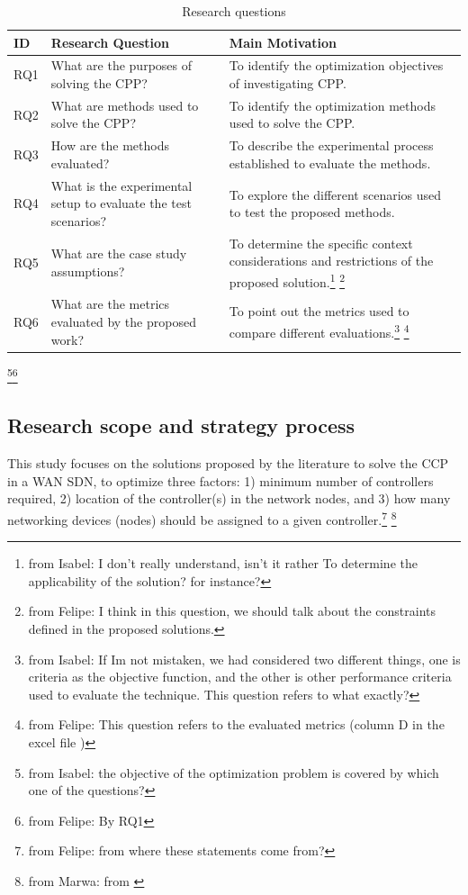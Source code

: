 \documentclass{IEEEtran}
\newcommand\fia[1]{{\color{red}\footnote{\color{red}from Isabel: #1}}} %
\newcommand\dia[1]{{\color{blue}\footnote{\color{blue}from Felipe: #1}}}
\newcommand\mc[1]{{\color{green}\footnote{\color{green}from Marwa: #1}}}
\begin{document}
\begin{table}[!h]
    \centering
    \begin{tabular}{l p{3.2cm} p{3.6cm} }
  \hline
  ID & Research Question & Main Motivation \\
  \hline
  RQ1 & What are the purposes of solving the CPP? & To identify the optimization objectives of investigating CPP. \\
  RQ2 & What are methods used to solve the CPP? & To identify the optimization methods used to solve the CPP. \\
  RQ3 & How are the methods evaluated? & To describe the experimental process established to evaluate the methods. \\%
  RQ4 & What is the experimental setup to evaluate the test scenarios? & To explore the different scenarios used to test the proposed methods. \\ %
  RQ5 & What are the case study assumptions? & To determine the specific context considerations and restrictions of the proposed solution.\fia{I don't really understand, isn't it rather To determine the applicability of the solution? for instance?} \dia{I think in this question, we should talk about the constraints defined in the proposed solutions.} \\
  RQ6 & What are the metrics evaluated by the proposed work? & To point out the metrics used to compare different evaluations.\fia{If Im not mistaken, we had considered two different things, one is criteria as the objective function, and the other is other performance criteria used to evaluate the technique. This question refers to what exactly?} \dia{This question refers to the evaluated metrics (column D in the excel file )} \\
  \hline
\end{tabular}
    \caption{Research questions}
    \label{tab:QRs}
\end{table}\fia{the objective of the optimization problem is covered by which one of the questions?}\dia{By RQ1}

\subsection{Research scope and strategy process}
This study focuses on the solutions proposed by the literature to solve the CCP in a WAN SDN, to optimize three factors: 1)  minimum number of controllers required, 2) location of the controller(s) in the network nodes, and 3) how many networking devices (nodes) should be assigned to a given controller.\dia{from where these statements come from?} \mc{from \cite{SiSr18}}
\end{document}
